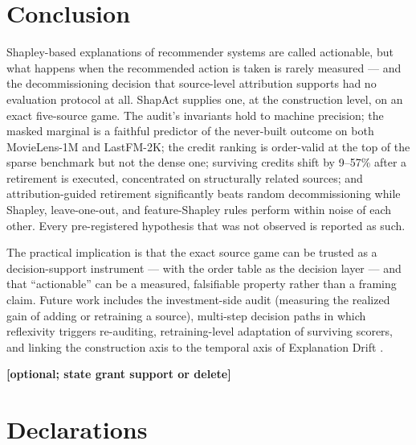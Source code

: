 \documentclass[pdflatex,sn-mathphys-num]{sn-jnl}
\theoremstyle{thmstyleone}%
\theoremstyle{thmstyletwo}%
\theoremstyle{thmstylethree}%
\newcommand{\tbd}[1]{\textbf{[#1]}}
\begin{document}
\section{Conclusion}\label{sec6}

Shapley-based explanations of recommender systems are called actionable, but what happens when the recommended action is taken is rarely measured --- and the decommissioning decision that source-level attribution supports had no evaluation protocol at all. ShapAct supplies one, at the construction level, on an exact five-source game. The audit's invariants hold to machine precision; the masked marginal is a faithful predictor of the never-built outcome on both MovieLens-1M and LastFM-2K; the credit ranking is order-valid at the top of the sparse benchmark but not the dense one; surviving credits shift by 9--57\% after a retirement is executed, concentrated on structurally related sources; and attribution-guided retirement significantly beats random decommissioning while Shapley, leave-one-out, and feature-Shapley rules perform within noise of each other. Every pre-registered hypothesis that was not observed is reported as such.

The practical implication is that the exact source game can be trusted as a decision-support instrument --- with the order table as the decision layer --- and that ``actionable'' can be a measured, falsifiable property rather than a framing claim. Future work includes the investment-side audit (measuring the realized gain of adding or retraining a source), multi-step decision paths in which reflexivity triggers re-auditing, retraining-level adaptation of surviving scorers, and linking the construction axis to the temporal axis of Explanation Drift \cite{nesmaoui2026drift}.

\backmatter

\tbd{optional; state grant support or delete}

\section*{Declarations}
\end{document}
